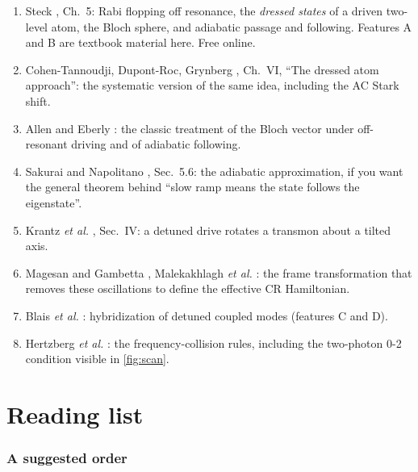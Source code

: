 \documentclass[11pt,a4paper]{article}
\begin{document}
\begin{readbox}
\begin{enumerate}
\item Steck \cite{steck}, Ch.~5: Rabi flopping off resonance, the \emph{dressed states} of a driven two-level atom, the
  Bloch sphere, and adiabatic passage and following. Features A and B are textbook material here. Free online.
\item Cohen-Tannoudji, Dupont-Roc, Grynberg \cite{cohen1992}, Ch.~VI, ``The dressed atom approach'': the systematic
  version of the same idea, including the AC Stark shift.
\item Allen and Eberly \cite{allen1987}: the classic treatment of the Bloch vector under off-resonant driving and of
  adiabatic following.
\item Sakurai and Napolitano \cite{sakurai}, Sec.~5.6: the adiabatic approximation, if you want the general theorem
  behind ``slow ramp means the state follows the eigenstate''.
\item Krantz \emph{et al.} \cite{krantz2019}, Sec.~IV: a detuned drive rotates a transmon about a tilted axis.
\item Magesan and Gambetta \cite{magesan2020}, Malekakhlagh \emph{et al.} \cite{malekakhlagh2020}: the frame
  transformation that removes these oscillations to define the effective CR Hamiltonian.
\item Blais \emph{et al.} \cite{blais2021}: hybridization of detuned coupled modes (features C and D).
\item Hertzberg \emph{et al.} \cite{hertzberg2021}: the frequency-collision rules, including the two-photon 0-2 condition
  visible in \cref{fig:scan}.
\end{enumerate}
\end{readbox}

\part{Reading list}\label{part:reading}

\section{A suggested order}
\end{document}
